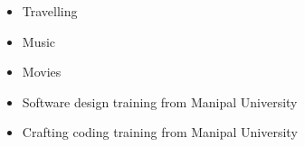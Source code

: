 
\divider

\divider



\begin{itemize}
    
    \item Travelling
    \item Music
    \item Movies
\end{itemize}

\begin{itemize}
    \item Software design training from Manipal University
    \item Crafting coding training from Manipal University
  
\end{itemize}
